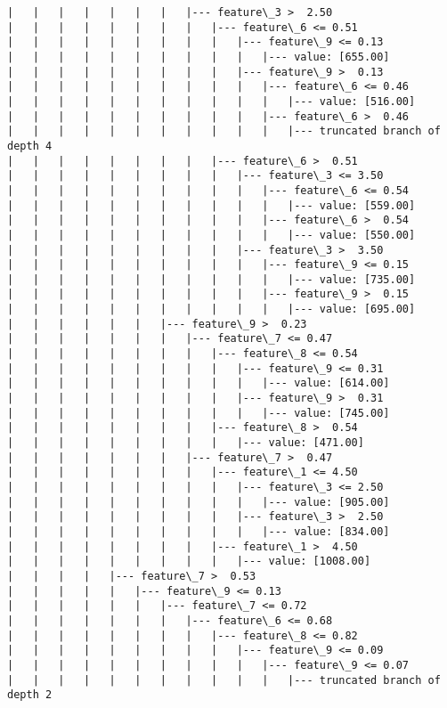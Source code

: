 \documentclass[11pt]{article}
\begin{document}
\begin{Verbatim}[commandchars=\\\{\}]
|   |   |   |   |   |   |   |--- feature\_3 >  2.50
|   |   |   |   |   |   |   |   |--- feature\_6 <= 0.51
|   |   |   |   |   |   |   |   |   |--- feature\_9 <= 0.13
|   |   |   |   |   |   |   |   |   |   |--- value: [655.00]
|   |   |   |   |   |   |   |   |   |--- feature\_9 >  0.13
|   |   |   |   |   |   |   |   |   |   |--- feature\_6 <= 0.46
|   |   |   |   |   |   |   |   |   |   |   |--- value: [516.00]
|   |   |   |   |   |   |   |   |   |   |--- feature\_6 >  0.46
|   |   |   |   |   |   |   |   |   |   |   |--- truncated branch of depth 4
|   |   |   |   |   |   |   |   |--- feature\_6 >  0.51
|   |   |   |   |   |   |   |   |   |--- feature\_3 <= 3.50
|   |   |   |   |   |   |   |   |   |   |--- feature\_6 <= 0.54
|   |   |   |   |   |   |   |   |   |   |   |--- value: [559.00]
|   |   |   |   |   |   |   |   |   |   |--- feature\_6 >  0.54
|   |   |   |   |   |   |   |   |   |   |   |--- value: [550.00]
|   |   |   |   |   |   |   |   |   |--- feature\_3 >  3.50
|   |   |   |   |   |   |   |   |   |   |--- feature\_9 <= 0.15
|   |   |   |   |   |   |   |   |   |   |   |--- value: [735.00]
|   |   |   |   |   |   |   |   |   |   |--- feature\_9 >  0.15
|   |   |   |   |   |   |   |   |   |   |   |--- value: [695.00]
|   |   |   |   |   |   |--- feature\_9 >  0.23
|   |   |   |   |   |   |   |--- feature\_7 <= 0.47
|   |   |   |   |   |   |   |   |--- feature\_8 <= 0.54
|   |   |   |   |   |   |   |   |   |--- feature\_9 <= 0.31
|   |   |   |   |   |   |   |   |   |   |--- value: [614.00]
|   |   |   |   |   |   |   |   |   |--- feature\_9 >  0.31
|   |   |   |   |   |   |   |   |   |   |--- value: [745.00]
|   |   |   |   |   |   |   |   |--- feature\_8 >  0.54
|   |   |   |   |   |   |   |   |   |--- value: [471.00]
|   |   |   |   |   |   |   |--- feature\_7 >  0.47
|   |   |   |   |   |   |   |   |--- feature\_1 <= 4.50
|   |   |   |   |   |   |   |   |   |--- feature\_3 <= 2.50
|   |   |   |   |   |   |   |   |   |   |--- value: [905.00]
|   |   |   |   |   |   |   |   |   |--- feature\_3 >  2.50
|   |   |   |   |   |   |   |   |   |   |--- value: [834.00]
|   |   |   |   |   |   |   |   |--- feature\_1 >  4.50
|   |   |   |   |   |   |   |   |   |--- value: [1008.00]
|   |   |   |   |--- feature\_7 >  0.53
|   |   |   |   |   |--- feature\_9 <= 0.13
|   |   |   |   |   |   |--- feature\_7 <= 0.72
|   |   |   |   |   |   |   |--- feature\_6 <= 0.68
|   |   |   |   |   |   |   |   |--- feature\_8 <= 0.82
|   |   |   |   |   |   |   |   |   |--- feature\_9 <= 0.09
|   |   |   |   |   |   |   |   |   |   |--- feature\_9 <= 0.07
|   |   |   |   |   |   |   |   |   |   |   |--- truncated branch of depth 2

\end{Verbatim}
\end{document}
